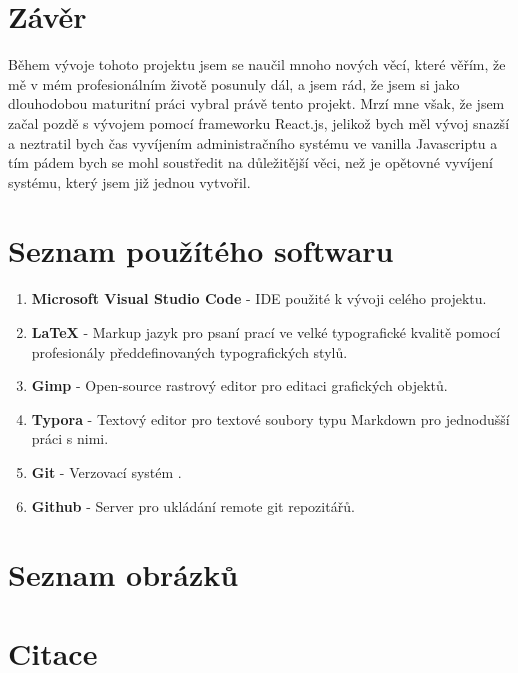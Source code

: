 \documentclass[12pt,a4paper]{report}
\begin{document}
  \chapter{Závěr}
  Během vývoje tohoto projektu jsem se naučil mnoho nových věcí, které věřím, že mě v mém
  profesionálním životě posunuly dál, a jsem rád, že jsem si jako dlouhodobou maturitní práci
  vybral právě tento projekt. Mrzí mne však, že jsem začal pozdě s vývojem pomocí frameworku
  React.js, jelikož bych měl vývoj snazší a neztratil bych čas vyvíjením administračního systému ve
  vanilla Javascriptu a tím pádem bych se mohl soustředit na důležitější věci, než je opětovné
  vyvíjení systému, který jsem již jednou vytvořil.
 
  \chapter{Seznam použítého softwaru}
    \begin{enumerate}
      \item \textbf{Microsoft Visual Studio Code} - IDE použité k vývoji celého projektu.   
      \item \textbf{LaTeX} - Markup jazyk pro psaní prací ve velké typografické kvalitě pomocí profesionály předdefinovaných typografických stylů.
      \item \textbf{Gimp} - Open-source rastrový editor pro editaci grafických objektů.
      \item \textbf{Typora} - Textový editor pro textové soubory typu Markdown pro jednodušší práci s nimi. 
      \item \textbf{Git} - Verzovací systém  .
      \item \textbf{Github} - Server pro ukládání remote git repozitářů.
    \end{enumerate}
  \chapter{Seznam obrázků}
 
 
  \chapter{Citace}
\end{document}
